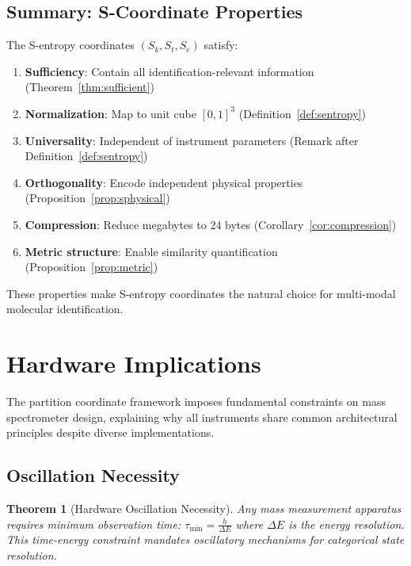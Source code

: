 \documentclass[twocolumn,10pt]{article}
\newtheorem{theorem}{Theorem}[section]
\begin{document}
\subsection{Summary: S-Coordinate Properties}

The S-entropy coordinates $(S_k, S_t, S_e)$ satisfy:
\begin{enumerate}
    \item \textbf{Sufficiency}: Contain all identification-relevant information (Theorem~\ref{thm:sufficient})
    \item \textbf{Normalization}: Map to unit cube $[0,1]^3$ (Definition~\ref{def:sentropy})
    \item \textbf{Universality}: Independent of instrument parameters (Remark after Definition~\ref{def:sentropy})
    \item \textbf{Orthogonality}: Encode independent physical properties (Proposition~\ref{prop:sphysical})
    \item \textbf{Compression}: Reduce megabytes to 24 bytes (Corollary~\ref{cor:compression})
    \item \textbf{Metric structure}: Enable similarity quantification (Proposition~\ref{prop:metric})
\end{enumerate}

These properties make S-entropy coordinates the natural choice for multi-modal molecular identification.

\section{Hardware Implications}
\label{sec:hardware}

The partition coordinate framework imposes fundamental constraints on mass spectrometer design, explaining why all instruments share common architectural principles despite diverse implementations.

\subsection{Oscillation Necessity}

\begin{theorem}[Hardware Oscillation Necessity]
\label{thm:hardware}
Any mass measurement apparatus requires minimum observation time:
$
\tau_{\min} = \frac{h}{\Delta E}
$
where $\Delta E$ is the energy resolution. This time-energy constraint mandates oscillatory mechanisms for categorical state resolution.
\end{theorem}
\end{document}
